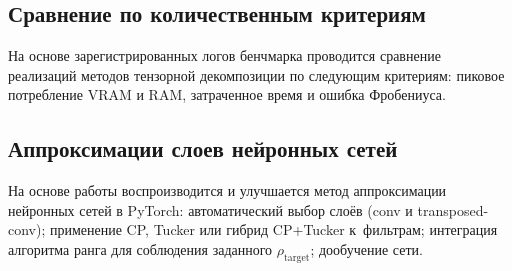 \subsection*{Сравнение по количественным критериям}
На основе зарегистрированных логов бенчмарка проводится сравнение реализаций методов тензорной декомпозиции по следующим критериям: пиковое потребление VRAM и RAM, затраченное время и ошибка Фробениуса.

\subsection*{Аппроксимации слоев нейронных сетей}
На основе работы \cite{stable_low_rank_tensor_decomposition} воспроизводится и улучшается метод аппроксимации нейронных сетей в PyTorch: автоматический выбор слоёв (conv и transposed-conv); применение CP, Tucker или гибрид CP+Tucker к~фильтрам; интеграция алгоритма ранга для соблюдения заданного $\rho_{\text{target}}$; дообучение сети.